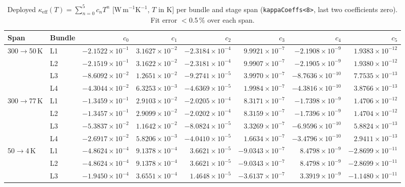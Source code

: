 \documentclass[11pt]{article}
\begin{document}
\begin{table}[H]\centering\scriptsize
\caption{Deployed $\kappa_{\mathrm{eff}}(T)=\sum_{n=0}^{5}c_nT^n$ [W\,m$^{-1}$K$^{-1}$, $T$ in K]
per bundle and stage span (\texttt{kappaCoeffs<8>}, last two coefficients zero). Fit error
$<0.5$\,\% over each span.}
\setlength{\tabcolsep}{4pt}
\begin{tabular}{l l r r r r r r}
\toprule
Span & Bundle & $c_0$ & $c_1$ & $c_2$ & $c_3$ & $c_4$ & $c_5$ \\
\midrule
300$\to$50\,K & L1 & $-2.1522\times10^{-1}$ & $3.1627\times10^{-2}$ & $-2.3184\times10^{-4}$ & $9.9921\times10^{-7}$ & $-2.1908\times10^{-9}$ & $1.9383\times10^{-12}$ \\
 & L2 & $-2.1519\times10^{-1}$ & $3.1622\times10^{-2}$ & $-2.3181\times10^{-4}$ & $9.9907\times10^{-7}$ & $-2.1905\times10^{-9}$ & $1.9380\times10^{-12}$ \\
 & L3 & $-8.6092\times10^{-2}$ & $1.2651\times10^{-2}$ & $-9.2741\times10^{-5}$ & $3.9970\times10^{-7}$ & $-8.7636\times10^{-10}$ & $7.7535\times10^{-13}$ \\
 & L4 & $-4.3044\times10^{-2}$ & $6.3253\times10^{-3}$ & $-4.6369\times10^{-5}$ & $1.9984\times10^{-7}$ & $-4.3816\times10^{-10}$ & $3.8766\times10^{-13}$ \\
300$\to$77\,K & L1 & $-1.3459\times10^{-1}$ & $2.9103\times10^{-2}$ & $-2.0205\times10^{-4}$ & $8.3171\times10^{-7}$ & $-1.7398\times10^{-9}$ & $1.4706\times10^{-12}$ \\
 & L2 & $-1.3457\times10^{-1}$ & $2.9099\times10^{-2}$ & $-2.0202\times10^{-4}$ & $8.3159\times10^{-7}$ & $-1.7396\times10^{-9}$ & $1.4704\times10^{-12}$ \\
 & L3 & $-5.3837\times10^{-2}$ & $1.1642\times10^{-2}$ & $-8.0824\times10^{-5}$ & $3.3269\times10^{-7}$ & $-6.9596\times10^{-10}$ & $5.8824\times10^{-13}$ \\
 & L4 & $-2.6917\times10^{-2}$ & $5.8206\times10^{-3}$ & $-4.0410\times10^{-5}$ & $1.6634\times10^{-7}$ & $-3.4796\times10^{-10}$ & $2.9411\times10^{-13}$ \\
50$\to$4\,K & L1 & $-4.8624\times10^{-4}$ & $9.1378\times10^{-4}$ & $3.6621\times10^{-5}$ & $-9.0343\times10^{-7}$ & $8.4798\times10^{-9}$ & $-2.8699\times10^{-11}$ \\
 & L2 & $-4.8624\times10^{-4}$ & $9.1378\times10^{-4}$ & $3.6621\times10^{-5}$ & $-9.0343\times10^{-7}$ & $8.4798\times10^{-9}$ & $-2.8699\times10^{-11}$ \\
 & L3 & $-1.9450\times10^{-4}$ & $3.6551\times10^{-4}$ & $1.4648\times10^{-5}$ & $-3.6137\times10^{-7}$ & $3.3919\times10^{-9}$ & $-1.1480\times10^{-11}$ \\

\end{tabular}
\end{table}
\end{document}
